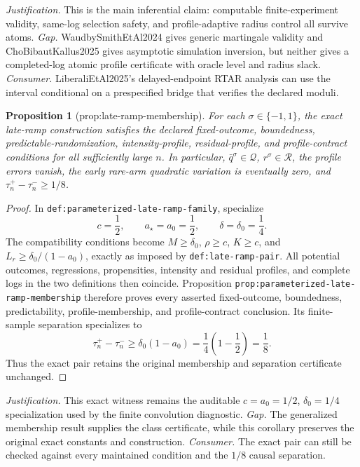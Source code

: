 \documentclass{article}
\newtheorem{proposition}{Proposition}
\begin{document}
\par\smallskip\noindent \textit{Justification.} This is the main inferential claim: computable finite-experiment validity, same-log selection safety, and profile-adaptive radius control all survive atoms. \textit{Gap.} WaudbySmithEtAl2024 gives generic martingale validity and ChoBibautKallus2025 gives asymptotic simulation inversion, but neither gives a completed-log atomic profile certificate with oracle level and radius slack. \textit{Consumer.} LiberaliEtAl2025's delayed-endpoint RTAR analysis can use the interval conditional on a prespecified bridge that verifies the declared moduli.

\begin{proposition}[prop:late-ramp-membership]\label{prop:late-ramp-membership}
For each \(\sigma\in\{-1,1\}\), the exact late-ramp construction satisfies the declared fixed-outcome, boundedness, predictable-randomization, intensity-profile, residual-profile, and profile-contract conditions for all sufficiently large \(n\). In particular, \(\bar q^{\sigma}\in\mathcal Q\), \(r^{\sigma}\in\mathcal R\), the profile errors vanish, the early rare-arm quadratic variation is eventually zero, and \(\tau_n^{+}-\tau_n^{-}\ge1/8\).
\end{proposition}
\begin{proof}
In \texttt{def:parameterized-late-ramp-family}, specialize
\[
 c=\frac12,
 \qquad
 a_\star=a_0=\frac12,
 \qquad
 \delta=\delta_0=\frac14.
\]
The compatibility conditions become \(M\ge\delta_0\), \(\rho\ge c\), \(K\ge c\), and \(L_r\ge\delta_0/(1-a_0)\), exactly as imposed by \texttt{def:late-ramp-pair}. All potential outcomes, regressions, propensities, intensity and residual profiles, and complete logs in the two definitions then coincide. Proposition \texttt{prop:parameterized-late-ramp-membership} therefore proves every asserted fixed-outcome, boundedness, predictability, profile-membership, and profile-contract conclusion. Its finite-sample separation specializes to
\[
 \tau_n^+-\tau_n^-
 \ge\delta_0(1-a_0)
 =\frac14\left(1-\frac12\right)
 =\frac18.
\]
Thus the exact pair retains the original membership and separation certificate unchanged.
\end{proof}
\par\smallskip\noindent \textit{Justification.} This exact witness remains the auditable \(c=a_0=1/2\), \(\delta_0=1/4\) specialization used by the finite convolution diagnostic. \textit{Gap.} The generalized membership result supplies the class certificate, while this corollary preserves the original exact constants and construction. \textit{Consumer.} The exact pair can still be checked against every maintained condition and the \(1/8\) causal separation.
\end{document}
